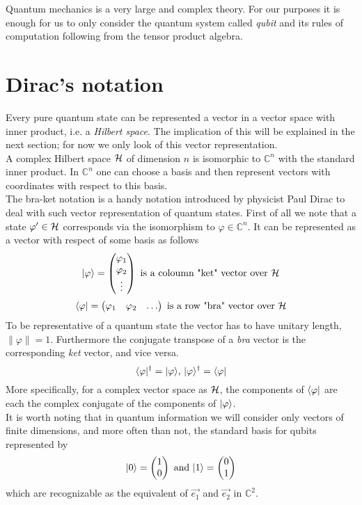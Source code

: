 	Quantum mechanics is a very large and complex theory. For our purposes it is enough for us to only consider the quantum system called \emph{qubit} and its rules of computation following from the tensor product algebra. 

\section{Dirac's notation}
	Every pure quantum state can be represented a vector in a vector space with inner product, i.e. a \emph{Hilbert space}. 
	The implication of this will be explained in the next section; for now we only look of this vector representation.\\
	 A complex Hilbert space $\mathcal{H}$ of dimension $n$ is isomorphic to $ \mathbb{C}^n $ with the standard inner product. 
	 In $\mathbb{C}^n $ one can choose a basis and then represent vectors with coordinates with respect to this basis.\\
	The bra-ket notation is a handy notation introduced by physicist Paul Dirac to deal with such vector representation of quantum states. 
	First of all we note that a state $\varphi '\in\mathcal{H}$ corresponds via the isomorphism to $ \varphi  \in \mathbb{C}^n $. It can be represented as a vector with respect of some basis as follows
	$$|\varphi \rangle = \begin{pmatrix} \varphi_1 \\ \varphi_2 \\ \vdots \end{pmatrix}	  \text{  is a coloumn "ket" vector over } \mathcal{H} $$
	$$\langle \varphi|  = \begin{pmatrix} \varphi_1 & \varphi_2 & \hdots \end{pmatrix} \text{  is a row "bra" vector over } \mathcal{H} $$
	To be representative of a quantum state the vector has to have unitary length, $\|\varphi\|= 1$.
	Furthermore the conjugate transpose of a \emph{bra} vector is the corresponding \emph{ket} vector, and vice versa.
	$$ \langle \varphi|^{\dagger} = |\varphi \rangle \text{,    } |\varphi \rangle^{\dagger} = \langle \varphi|$$
	More specifically, for a complex vector space as $\mathcal{H}$, the components of $\langle \varphi|$ are each the complex conjugate of the components of $|\varphi \rangle$.\\
	It is worth noting that in quantum information we will consider only vectors of finite dimensions, and more often than not, the standard basis for qubits represented by
	$$|0 \rangle =  \begin{pmatrix} 1 \\ 0 \end{pmatrix}
	\text{ and }
	|1 \rangle =  \begin{pmatrix} 0 \\ 1 \end{pmatrix}$$
	which are recognizable as the equivalent of $\vec{e_1}$ and $\vec{e_2}$ in $\mathbb{C}^2$.\\
	
